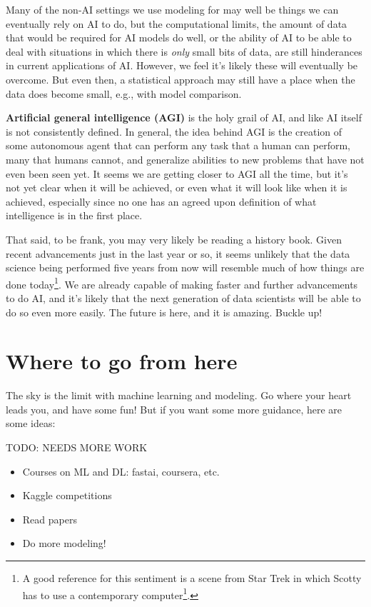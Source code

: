 \documentclass[
  letterpaper,
]{krantz}
\providecommand{\tightlist}{%
  \setlength{\itemsep}{0pt}\setlength{\parskip}{0pt}}\usepackage{longtable,booktabs,array}
\DeclareRobustCommand{\href}[2]{#2\footnote{\url{#1}}}
\begin{document}
Many of the non-AI settings we use modeling for may well be things we
can eventually rely on AI to do, but the computational limits, the
amount of data that would be required for AI models do well, or the
ability of AI to be able to deal with situations in which there is
\emph{only} small bits of data, are still hinderances in current
applications of AI. However, we feel it's likely these will eventually
be overcome. But even then, a statistical approach may still have a
place when the data does become small, e.g., with model comparison.

\textbf{Artificial general intelligence (AGI)} is the holy grail of AI,
and like AI itself is not consistently defined. In general, the idea
behind AGI is the creation of some autonomous agent that can perform any
task that a human can perform, many that humans cannot, and generalize
abilities to new problems that have not even been seen yet. It seems we
are getting closer to AGI all the time, but it's not yet clear when it
will be achieved, or even what it will look like when it is achieved,
especially since no one has an agreed upon definition of what
intelligence is in the first place.

That said, to be frank, you may very likely be reading a history book.
Given recent advancements just in the last year or so, it seems unlikely
that the data science being performed five years from now will resemble
much of how things are done today\footnote{A good reference for this
  sentiment is a scene from Star Trek in which
  \href{https://www.youtube.com/watch?v=hShY6xZWVGE}{Scotty has to use a
  contemporary computer}.}. We are already capable of making faster and
further advancements to do AI, and it's likely that the next generation
of data scientists will be able to do so even more easily. The future is
here, and it is amazing. Buckle up!

\section{Where to go from here}\label{where-to-go-from-here-3}

The sky is the limit with machine learning and modeling. Go where your
heart leads you, and have some fun! But if you want some more guidance,
here are some ideas:

TODO: NEEDS MORE WORK

\begin{itemize}
\tightlist
\item
  Courses on ML and DL: fastai, coursera, etc.
\item
  Kaggle competitions
\item
  Read papers
\item
  Do more modeling!
\end{itemize}
\end{document}
